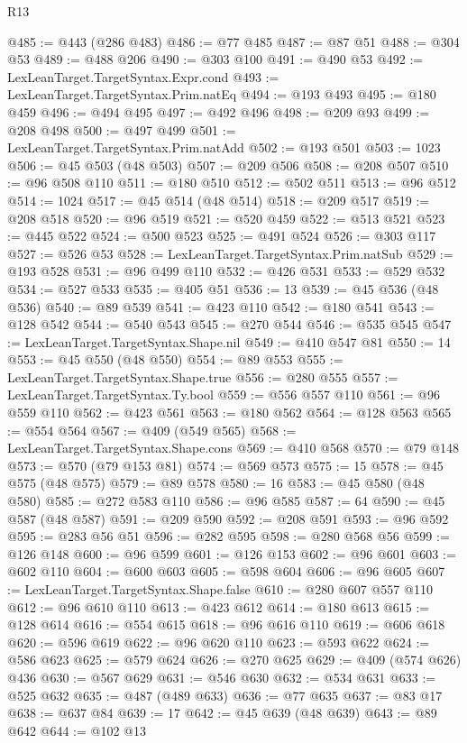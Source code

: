 \begin{lexlean}{R13}
\begin{coremodule}
@485 := @443 (@286 @483)
@486 := @77 @485
@487 := @87 @51
@488 := @304 @53
@489 := @488 @206
@490 := @303 @100
@491 := @490 @53
@492 := LexLeanTarget.TargetSyntax.Expr.cond
@493 := LexLeanTarget.TargetSyntax.Prim.natEq
@494 := @193 @493
@495 := @180 @459
@496 := @494 @495
@497 := @492 @496
@498 := @209 @93
@499 := @208 @498
@500 := @497 @499
@501 := LexLeanTarget.TargetSyntax.Prim.natAdd
@502 := @193 @501
@503 := 1023
@506 := @45 @503 (@48 @503)
@507 := @209 @506
@508 := @208 @507
@510 := @96 @508 @110
@511 := @180 @510
@512 := @502 @511
@513 := @96 @512
@514 := 1024
@517 := @45 @514 (@48 @514)
@518 := @209 @517
@519 := @208 @518
@520 := @96 @519
@521 := @520 @459
@522 := @513 @521
@523 := @445 @522
@524 := @500 @523
@525 := @491 @524
@526 := @303 @117
@527 := @526 @53
@528 := LexLeanTarget.TargetSyntax.Prim.natSub
@529 := @193 @528
@531 := @96 @499 @110
@532 := @426 @531
@533 := @529 @532
@534 := @527 @533
@535 := @405 @51
@536 := 13
@539 := @45 @536 (@48 @536)
@540 := @89 @539
@541 := @423 @110
@542 := @180 @541
@543 := @128 @542
@544 := @540 @543
@545 := @270 @544
@546 := @535 @545
@547 := LexLeanTarget.TargetSyntax.Shape.nil
@549 := @410 @547 @81
@550 := 14
@553 := @45 @550 (@48 @550)
@554 := @89 @553
@555 := LexLeanTarget.TargetSyntax.Shape.true
@556 := @280 @555
@557 := LexLeanTarget.TargetSyntax.Ty.bool
@559 := @556 @557 @110
@561 := @96 @559 @110
@562 := @423 @561
@563 := @180 @562
@564 := @128 @563
@565 := @554 @564
@567 := @409 (@549 @565)
@568 := LexLeanTarget.TargetSyntax.Shape.cons
@569 := @410 @568
@570 := @79 @148
@573 := @570 (@79 @153 @81)
@574 := @569 @573
@575 := 15
@578 := @45 @575 (@48 @575)
@579 := @89 @578
@580 := 16
@583 := @45 @580 (@48 @580)
@585 := @272 @583 @110
@586 := @96 @585
@587 := 64
@590 := @45 @587 (@48 @587)
@591 := @209 @590
@592 := @208 @591
@593 := @96 @592
@595 := @283 @56 @51
@596 := @282 @595
@598 := @280 @568 @56
@599 := @126 @148
@600 := @96 @599
@601 := @126 @153
@602 := @96 @601
@603 := @602 @110
@604 := @600 @603
@605 := @598 @604
@606 := @96 @605
@607 := LexLeanTarget.TargetSyntax.Shape.false
@610 := @280 @607 @557 @110
@612 := @96 @610 @110
@613 := @423 @612
@614 := @180 @613
@615 := @128 @614
@616 := @554 @615
@618 := @96 @616 @110
@619 := @606 @618
@620 := @596 @619
@622 := @96 @620 @110
@623 := @593 @622
@624 := @586 @623
@625 := @579 @624
@626 := @270 @625
@629 := @409 (@574 @626) @436
@630 := @567 @629
@631 := @546 @630
@632 := @534 @631
@633 := @525 @632
@635 := @487 (@489 @633)
@636 := @77 @635
@637 := @83 @17
@638 := @637 @84
@639 := 17
@642 := @45 @639 (@48 @639)
@643 := @89 @642
@644 := @102 @13

\end{coremodule}
\end{lexlean}
